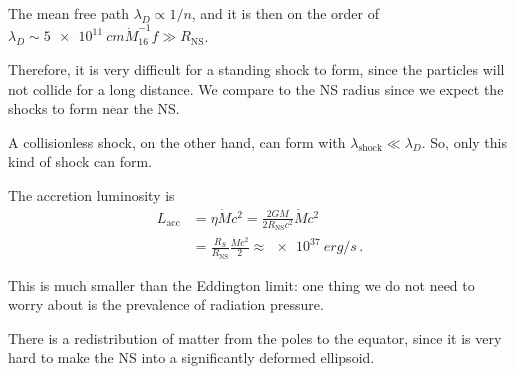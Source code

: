 \documentclass[main.tex]{subfiles}
\begin{document}
The mean free path \(\lambda _D \propto 1/n\), and it is then on the order of \(\lambda _D \sim \SI{5e11}{cm} \dot{M}_{16}^{-1} f \gg R _{\text{NS}}\). 

Therefore, it is very difficult for a standing shock to form, since the particles will not collide for a long distance. 
We compare to the NS radius since we expect the shocks to form near the NS. 

A collisionless shock, on the other hand, can form with \(\lambda _{\text{shock}} \ll \lambda _D\). 
So, only this kind of shock can form. 

The accretion luminosity is 
%
\begin{align}
L _{\text{acc}} &= \eta \dot{M} c^2 = \frac{2GM}{2 R _{\text{NS}}c^2} \dot{M} c^2  \\
&= \frac{R_S}{R _{\text{NS}}} \frac{\dot{M}c^2}{2} \approx \SI{e37}{erg/s}
\,.
\end{align}

This is much smaller than the Eddington limit: one thing we do not need to worry about is the prevalence of radiation pressure. 

There is a redistribution of matter from the poles to the equator, since it is very hard to make the NS into a significantly deformed ellipsoid.
\end{document}
